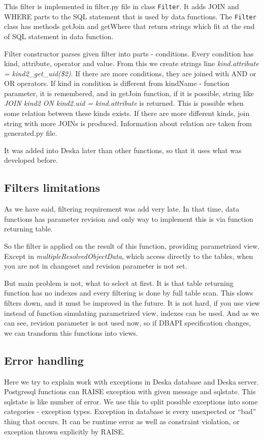 \documentclass[deska]{subfiles}
\begin{document}
This filter is implemented in filter.py file in class {\tt Filter}.
It adds JOIN and WHERE parts to the SQL statement that is used by data functions. The {\tt Filter} class has
methods getJoin and getWhere that return strings which fit at the end of SQL statement in data function.

Filter constructor parses given filter into parts - conditions.
Every condition has kind, attribute, operator and value. From this we create strings line
{\em kind.attribute = kind2\_get\_uid(\$2)}. If there are more conditions, they are joined with AND or OR
operators.
If kind in condition is different from kindName - function parameter, it is remembered,
and in getJoin function, if it is possible, string like {\em JOIN kind2 ON kind2.uid = kind.attribute}
is returned. This is possible when some relation between these kinds exists.
If there are more different kinds, join string with more JOINs is produced.
Information about relation are taken from generated.py file.

It was added into Deska later than other functions, so that it uses what was developed before.

\subsection{Filters limitations}
\label{sec:filter-speed}
As we have said, filtering requirement was add very late. In that time, data functions has parameter revision
and only way to implement this is via function returning table.

So the filter is applied on the result of this function, providing parametrized view.
Except in {\em multipleResolvedObjectData}, which access directly to the tables, when
you are not in changeset and revision parameter is not set.

But main problem is not, what to select at first. It is that table returning function has
no indexes and every filtering is done by full table scan.
This slows filters down, and it must be improved in the future. It is not hard,
if you use view instead of function simulating parametrized view, indexes can be used.
And as we can see, revision parameter is not used now, so if DBAPI specification changes,
we can transform this functions into views. 

\subsection{Error handling}
Here we try to explain work with exceptions in Deska database and Deska server. Postgresql functions can RAISE exception with given message and sqlstate.
This sqlstate is like number of error. We use this to split possible exceptions into some categories - exception types. Exception in database is
every unexpected or “bad” thing that occurs. It can be runtime error as well as constraint violation, or exception thrown explicitly by RAISE.
\end{document}
